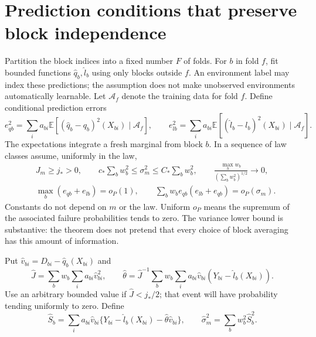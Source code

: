 \documentclass[11pt]{article}
\theoremstyle{remark}
\newcommand{\E}{\mathbb E}
\begin{document}
\section{Prediction conditions that preserve block independence}
Partition the block indices into a fixed number $F$ of folds. For $b$ in fold $f$, fit bounded functions $\widehat q_b,\widehat l_b$ using only blocks outside $f$. An environment label may index these predictions; the assumption does not make unobserved environments automatically learnable. Let $\mathcal A_f$ denote the training data for fold $f$. Define conditional prediction errors
\[
 e_{qb}^2=\sum_i a_{bi}\E[(\widehat q_b-q_b)^2(X_{bi})\mid\mathcal A_f],
 \qquad
 e_{lb}^2=\sum_i a_{bi}\E[(\widehat l_b-l_b)^2(X_{bi})\mid\mathcal A_f].
\]
The expectations integrate a fresh marginal from block $b$. In a sequence of law classes assume, uniformly in the law,
\begin{align}
 &J_m\geq j_*>0,\qquad
 c_*\sum_b w_b^2\leq\sigma_m^2\leq C_*\sum_b w_b^2,
 \qquad \frac{\max_b w_b}{(\sum_b w_b^2)^{1/2}}\longrightarrow0,
                                                        \label{info}\\
 &\max_b(e_{qb}+e_{lb})=o_P(1),\qquad
 \sum_b w_b e_{qb}(e_{lb}+e_{qb})=o_P(\sigma_m).
                                                        \label{rates}
\end{align}
Constants do not depend on $m$ or the law. Uniform $o_P$ means the supremum of the associated failure probabilities tends to zero. The variance lower bound is substantive: the theorem does not pretend that every choice of block averaging has this amount of information.

Put $\widehat v_{bi}=D_{bi}-\widehat q_b(X_{bi})$ and
\[
 \widehat J=\sum_b w_b\sum_i a_{bi}\widehat v_{bi}^2,
 \qquad
 \widehat\theta=\widehat J^{-1}
   \sum_b w_b\sum_i a_{bi}\widehat v_{bi}(Y_{bi}-\widehat l_b(X_{bi})).
\]
Use an arbitrary bounded value if $\widehat J<j_*/2$; that event will have probability tending uniformly to zero. Define
\[
 \widehat S_b=\sum_i a_{bi}\widehat v_{bi}
       \{Y_{bi}-\widehat l_b(X_{bi})-\widehat\theta\widehat v_{bi}\},
 \qquad \widehat\sigma_m^2=\sum_b w_b^2\widehat S_b^2.
\]
\end{document}
